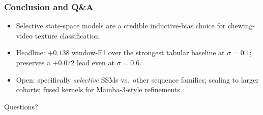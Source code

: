 \documentclass[aspectratio=169]{beamer}
\begin{document}
\begin{frame}
  \frametitle{Conclusion and Q\&A}
  \begin{itemize}
    \item Selective state-space models are a credible inductive-bias choice for
          chewing-video texture classification.
    \item Headline: $+0.138$ window-F1 over the strongest tabular baseline at $\sigma = 0.1$;
          preserves a $+0.072$ lead even at $\sigma = 0.6$.
    \item Open: specifically \emph{selective} SSMs vs.\ other sequence families;
          scaling to larger cohorts; fused kernels for Mamba-3-style refinements.
  \end{itemize}
  \vspace{1.0em}
  \begin{center}
    \Large Questions?
  \end{center}
\end{frame}
\end{document}
